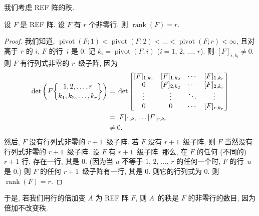 \documentclass[../libro.tex]{subfiles}
\begin{document}
我们考虑 REF 阵的秩.

\begin{theorem}
    设 \(F\) 是 REF 阵.
    设 \(F\) 有 \(r\) 个非零行.
    则 \(\operatorname{rank} {(F)} = r\).
\end{theorem}

\begin{proof}
    我们知道,
    \(\operatorname{pivot} {(F; 1)}
        < \operatorname{pivot} {(F; 2)}
        < \dots
        < \operatorname{pivot} {(F; r)}
    < \infty\),
    且对高于 \(r\) 的 \(i\),
    \(F\) 的行~\(i\) 是 \(0\).
    记 \(k_i = \operatorname{pivot} {(F; i)}\)
    (\(i = 1\), \(2\), \(\dots\), \(r\)).
    则 \([F]_{i,k_i} \neq 0\).
    则 \(F\) 有行列式非零的 \(r\)~级子阵, 因为
    \begin{align*}
        \det {\left(
                F\submat{1,2,\dots,r}{k_1,k_2,\dots,k_r}
        \right)}
        = {} &
        \det {
            \begin{bmatrix}
                [F]_{1,k_1} & [F]_{1,k_2} & \cdots & [F]_{1,k_r} \\
                0           & [F]_{2,k_2} & \cdots & [F]_{2,k_r} \\
                \vdots      & \vdots      & \ddots & \vdots      \\
                0           & 0           & \cdots & [F]_{r,k_r} \\
            \end{bmatrix}
        }
        \\
        = {} &
        [F]_{1,k_1} \dots [F]_{r,k_r}
        \\
        \neq {} &
        0.
    \end{align*}
    然后, \(F\) 没有行列式非零的 \(r + 1\)~级子阵.
    若 \(F\) 没有 \(r + 1\)~级子阵,
    则 \(F\) 当然没有行列式非零的 \(r + 1\)~级子阵.
    设 \(F\) 有 \(r + 1\)~级子阵.
    那么, 在 \(F\) 的任何 (不同的) \(r + 1\) 行,
    存在一行, 其是 \(0\).
    (因为当 \(u\) 不等于 %
    \(1\), \(2\), \(\dots\), \(r\)
    的任何一个时,
    \(F\) 的行~\(u\) 是 \(0\).) %
    则 \(F\) 的任何 \(r + 1\)~级子阵有一行, 其是 \(0\).
    则它的行列式为 \(0\).
    则 \(\operatorname{rank} {(F)} = r\).
\end{proof}

于是, 若我们用行的倍加变 \(A\) 为 REF 阵 \(F\),
则 \(A\)~的秩是 \(F\) 的非零行的数目,
因为倍加不改变秩.
\end{document}
